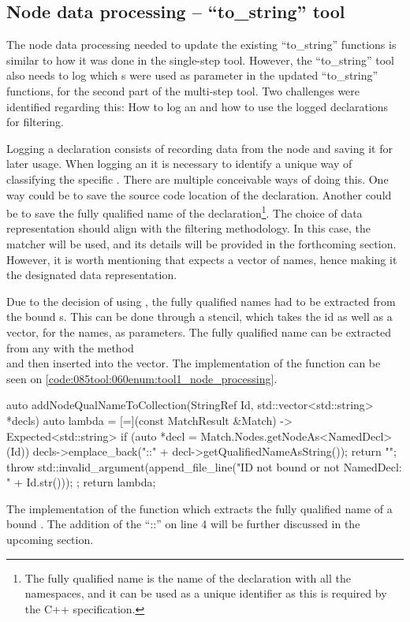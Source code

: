 \subsection{Node data processing -- ``to\_string'' tool}
The node data processing needed to update the existing ``to\_string'' functions is similar to how it was done in the single-step tool.
However, the ``to\_string'' tool also needs to log which s were used as parameter in the updated ``to\_string'' functions, for the second part of the multi-step tool.
Two challenges were identified regarding this: How to log an  and how to use the logged declarations for filtering.

Logging a declaration consists of recording data from the node and saving it for later usage.
When logging an  it is necessary to identify a unique way of classifying the specific . There are multiple conceivable ways of doing this.
One way could be to save the source code location of the declaration. Another could be to save the fully qualified name of the declaration\footnote{The fully qualified name is the name of the declaration with all the namespaces, and it can be used as a unique identifier as this is required by the C++ specification.}.
The choice of data representation should align with the filtering methodology. In this case, the matcher  will be used, and its details will be provided in the forthcoming section.
However, it is worth mentioning that  expects a vector of names, hence making it the designated data representation.

Due to the decision of using , the fully qualified names had to be extracted from the bound s.
This can be done through a stencil, which takes the id as well as a vector, for the names, as parameters.
The fully qualified name can be extracted from any  with the method\\
 and then inserted into the vector. 
The implementation of the function can be seen on \cref{code:085tool:060enum:tool1_node_processing}.

\begin{listing}[H]
  \begin{cppcode}
auto addNodeQualNameToCollection(StringRef Id, std::vector<std::string> *decls) {
	auto lambda = [=](const MatchResult &Match) -> Expected<std::string> {
		if (auto *decl = Match.Nodes.getNodeAs<NamedDecl>(Id)) {
			decls->emplace_back("::" + decl->getQualifiedNameAsString());
			return "";
		}
		throw std::invalid_argument(append_file_line("ID not bound or not NamedDecl: " + Id.str()));
	};
	return lambda;
}
  \end{cppcode}
  \caption{The implementation of the function which extracts the fully qualified name of a bound . The addition of the ``::'' on line 4 will be further discussed in the upcoming section.}
  \label{code:085tool:060enum:tool1_node_processing}
\end{listing}

